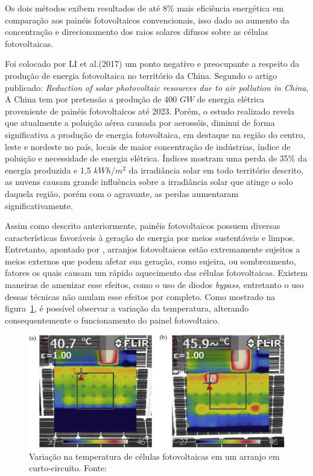 Os dois métodos exibem resultados de até 8\% mais eficiência energética em comparação aos painéis fotovoltaicos convencionais, isso dado ao aumento da concentração e direcionamento dos raios solares difusos sobre as células fotovoltaicas.

Foi colocado por LI et al.(2017) um ponto negativo e preocupante a respeito da produção de energia fotovoltaica no território da China. Segundo o artigo publicado: \textit{Reduction of solar photovoltaic resources due to air pollution in China}, A China tem por pretensão a produção de 400 $GW$ de energia elétrica proveniente de painéis fotovoltaicos até 2023. Porém, o estudo realizado revela que atualmente a poluição aérea causada por aerossóis, diminui de forma significativa a produção de energia fotovoltaica, em destaque na região do centro, leste e nordeste no país, locais de maior concentração de indústrias, índice de poluição e necessidade de energia elétrica. Índices mostram uma perda de 35\% da energia produzida e 1,5 $kWh/m^2$ da irradiância solar em todo território descrito, as nuvens causam grande influência sobre a irradiância solar que atinge o solo daquela região, porém com o agravante, as perdas aumentaram significativamente.

Assim como descrito anteriormente, painéis fotovoltaicos possuem diversas características favoráveis à geração de energia por meios sustentáveis e limpos. Entretanto, apontado por , arranjos fotovoltaicos estão extremamente sujeitos a meios externos que podem afetar sua geração, como sujeira, ou sombreamento, fatores os quais causam um rápido aquecimento das células fotovoltaicas. Existem maneiras de amenizar esse efeitos, como o uso de diodos \textit{bypass}, entretanto o uso dessas técnicas não anulam esse efeitos por completo. Como mostrado na figura~\ref{fig:Temp}, é possível observar a variação da temperatura, alterando consequentemente o funcionamento do painel fotovoltaico.

\FloatBarrier
\begin{figure}[htbp]
	\centering
	\includegraphics[scale=1.3]{imagens/Temp_BRESSAN}
	\caption{Variação na temperatura de células fotovoltaicas em um arranjo em curto-circuito. Fonte:   }
	
	\label{fig:Temp}
\end{figure}
\FloatBarrier

